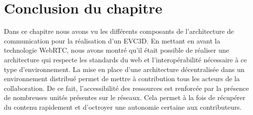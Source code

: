






\section{Conclusion du chapitre}
Dans ce chapitre nous avons vu les différents composants de l'architecture de 
communication pour la réalisation d'un \gls{EVC3D}. En mettant en avant la 
technologie WebRTC, nous avons montré qu'il était possible de réaliser une 
architecture qui respecte les standards du web et l'interopérabilité nécessaire à ce 
type d'environnement. La mise en place d'une architecture décentralisée dans un 
environnement distribué permet de mettre à contribution tous les acteurs de la 
collaboration. De ce fait, l'accessibilité des ressources est renforcée par la 
présence de nombreuses unités présentes sur le réseaux. Cela permet à la fois 
de récupérer du contenu rapidement et d'octroyer une autonomie certaine aux 
contributeurs. 

